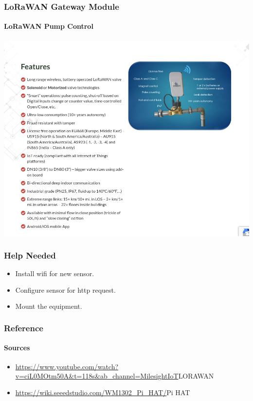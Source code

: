 \documentclass{beamer}
\begin{document}
\begin{frame}
  \frametitle{LoRaWAN Gateway Module}
  \framesubtitle{LoRaWAN Pump Control}
  \begin{center}
  \includegraphics[scale=0.2]{solernoid-valve.jpg}
  \end{center}
\end{frame}


\begin{frame}[t]
  \frametitle{Help Needed}
 \begin{itemize}
   \item Install wifi for new sensor.
   \item Configure sensor for http request.
   \item Mount the equipment.
 \end{itemize} 
\end{frame}


\begin{frame}[t]
  \frametitle{Reference }
  \framesubtitle{Sources}
 \begin{itemize}
    \item \url{https://www.youtube.com/watch?v=ciL0MOtm50A&t=118s&ab_channel=MilesightIoT}{LORAWAN}
    \item \url{https://wiki.seeedstudio.com/WM1302_Pi_HAT/}{Pi HAT}
  \end{itemize}
  
  
\end{frame}
\end{document}
